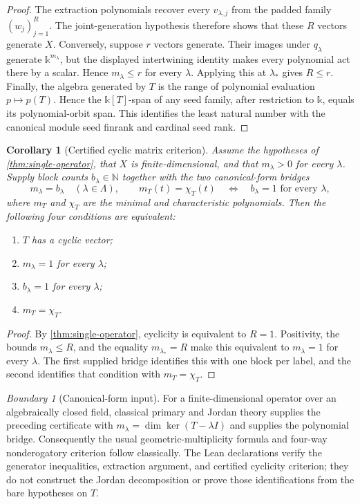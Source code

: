 \documentclass[11pt]{article}
\newtheorem{corollary}[theorem]{Corollary}
\theoremstyle{definition}
\theoremstyle{remark}
\newtheorem{boundary}[theorem]{Boundary}
\newcommand{\bbk}{\mathbb{k}}
\newcommand{\N}{\mathbb N}
\begin{document}
\begin{proof}
The extraction polynomials recover every $v_{\lambda,j}$ from the padded
family $(w_j)_{j=1}^{R}$.  The joint-generation hypothesis therefore shows
that these $R$ vectors generate $X$.  Conversely, suppose $r$ vectors
generate.  Their images under $q_{\lambda}$ generate
$\bbk^{m_{\lambda}}$, but the displayed intertwining identity makes every
polynomial act there by a scalar.  Hence $m_{\lambda}\le r$ for every
$\lambda$.  Applying this at $\lambda_*$ gives $R\le r$.  Finally,
the algebra generated by $T$ is the range of polynomial evaluation
$p\mapsto p(T)$.  Hence the $\bbk[T]$-span of any seed family, after
restriction to $\bbk$, equals its polynomial-orbit span.  This identifies the
least natural number with the canonical module seed finrank and cardinal seed
rank.
\end{proof}

\begin{corollary}[Certified cyclic matrix criterion]
\label{cor:cyclic-matrix-criterion}
Assume the hypotheses of \cref{thm:single-operator}, that $X$ is
finite-dimensional, and that $m_{\lambda}>0$ for every $\lambda$.  Supply
block counts $b_{\lambda}\in\N$ together with the two canonical-form bridges
\[
m_{\lambda}=b_{\lambda}\quad(\lambda\in\Lambda),
\qquad
m_T(t)=\chi_T(t)
\quad\Longleftrightarrow\quad
b_{\lambda}=1\text{ for every }\lambda,
\]
where $m_T$ and $\chi_T$ are the minimal and characteristic polynomials.
Then the following four conditions are equivalent:
\begin{enumerate}[label=(\roman*)]
\item $T$ has a cyclic vector;
\item $m_{\lambda}=1$ for every $\lambda$;
\item $b_{\lambda}=1$ for every $\lambda$;
\item $m_T=\chi_T$.
\end{enumerate}
\end{corollary}

\begin{proof}
By \cref{thm:single-operator}, cyclicity is equivalent to $R=1$.  Positivity,
the bounds $m_{\lambda}\le R$, and the equality
$m_{\lambda_*}=R$ make this equivalent to
$m_{\lambda}=1$ for every $\lambda$.  The first supplied bridge identifies
this with one block per label, and the second identifies that condition with
$m_T=\chi_T$.
\end{proof}

\begin{boundary}[Canonical-form input]
For a finite-dimensional operator over an algebraically closed field,
classical primary and Jordan theory supplies the preceding certificate with
$m_{\lambda}=\dim\ker(T-\lambda I)$ and supplies the polynomial bridge.
Consequently the usual geometric-multiplicity formula and four-way
nonderogatory criterion follow classically.  The Lean declarations verify
the generator inequalities, extraction argument, and certified cyclicity
criterion; they do not construct the Jordan decomposition or prove those
identifications from the bare hypotheses on $T$.
\end{boundary}
\end{document}
